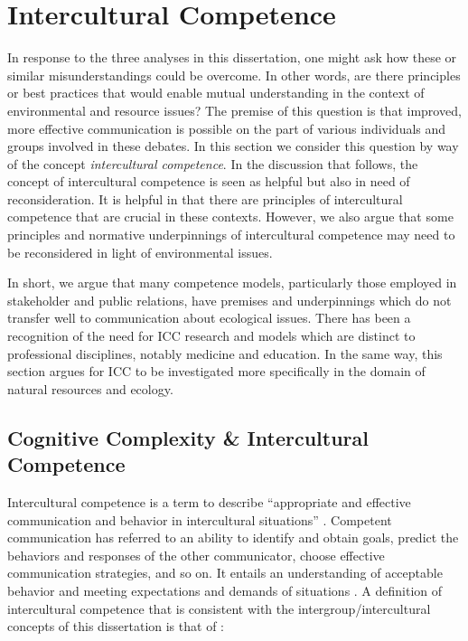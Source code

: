 \section{Intercultural Competence}

In response to the three analyses in this dissertation, one might ask how these or similar misunderstandings could be overcome. In other words, are there principles or best practices that would enable mutual understanding in the context of environmental and resource issues? The premise of this question is that improved, more effective communication is possible on the part of various individuals and groups involved in these debates. In this section we consider this question by way of the concept \textit{intercultural competence}. In the discussion that follows, the concept of intercultural competence is seen as helpful but also in need of reconsideration. It is helpful in that there are principles of intercultural competence that are crucial in these contexts. However, we also argue that some principles and normative underpinnings of intercultural competence may need to be reconsidered in light of environmental issues. 

In short, we argue that many competence models, particularly those employed in stakeholder and public relations, have premises and underpinnings which do not transfer well to communication about ecological issues. There has been a recognition of the need for ICC research and models which are distinct to professional disciplines, notably medicine and education. In the same way, this section argues for ICC to be investigated more specifically in the domain of natural resources and ecology.       

\subsection{Cognitive Complexity \& Intercultural Competence}

Intercultural competence is a term to describe ``appropriate and effective communication and behavior in intercultural situations'' \cite[xi]{Deardorff2009}.  Competent communication has referred to an ability to identify and obtain goals, predict the behaviors and responses of the other communicator, choose effective communication strategies, and so on. It entails an understanding of acceptable behavior and meeting expectations and demands of situations \citep[209]{Wiseman2001}. A definition of intercultural competence that is consistent with the intergroup/intercultural concepts of this dissertation is that of \cite*{Spitzberg2009}: 

